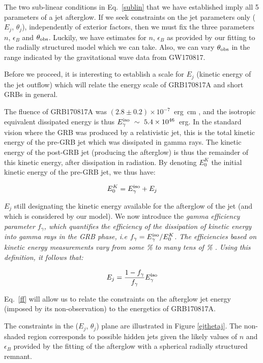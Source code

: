 The two sub-linear conditions in Eq.~\ref{sublin} that we have established imply all 5 parameters of a jet afterglow. If we seek constraints on the jet parameters only ($E_j$, $\theta_j$), independently of exterior factors, then we must fix the three parameters $n$, $\epsilon_B$ and $\thetaobs$. Luckily, we have estimates for $n$, $\epsilon_B$ as provided by our fitting to the radially structured model which we can take. Also, we can vary $\thetaobs$ in the range indicated by the gravitational wave data from GW170817.

Before we proceed, it is interesting to establish a scale for $E_j$ (kinetic energy of the jet outflow) which will relate the energy scale of GRB170817A and short GRBs in general.

The fluence of GRB170817A was $(2.8\pm0.2)\times10^{-7}$~erg~cm \citep{52}, and the isotropic equivalent dissipated energy is thus $E^{\rm{iso}}_\gamma~\sim~5.4 \times 10^{46}$~erg. In the standard vision where the GRB was produced by a relativistic jet, this is the total kinetic energy of the pre-GRB jet which was dissipated in gamma rays. The kinetic energy of the post-GRB jet (producing the afterglow) is thus the remainder of this kinetic energy, after dissipation in radiation. By denoting $E^K_0$ the initial kinetic energy of the pre-GRB jet, we thus have:

\begin{equation}E^K_0 = E^{\rm{iso}}_\gamma + E_j\end{equation}

$E_j$ still designating the kinetic energy available for the afterglow of the jet (and which is considered by our model). We now introduce the \it{gamma efficiency} parameter $f_\gamma$, which quantifies the efficiency of the dissipation of kinetic energy into gamma rays in the GRB phase, i.e $f_\gamma = E^{\rm{iso}}_\gamma/E^K_0$. The efficiencies based on kinetic energy measurements vary from some \% to many tens of \% \citep{47,48}. Using this definition, it follows that:

\begin{equation}\label{ff}
    E_j = \frac{1 - f_\gamma}{f_\gamma} E^{\rm{iso}}_\gamma
\end{equation}

Eq.~\ref{ff} will allow us to relate the constraints on the afterglow jet energy (imposed by its non-observation) to the energetics of GRB170817A.

The constraints in the ($E_j$, $\theta_j$) plane are illustrated in Figure \ref{ejthetaj}. The non-shaded region corresponds to possible hidden jets given the likely values of $n$ and $\epsilon_B$ provided by the fitting of the afterglow with a spherical radially structured remnant.

